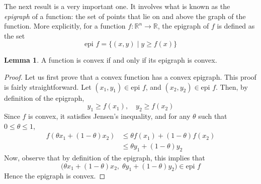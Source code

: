 \documentclass[a4paper]{article}
\theoremstyle{definition}
\newtheorem{lemma}{Lemma}[subsection]
\begin{document}
The next result is a very important one.
It involves what is known as the \textit{epigraph} of a function: the set of points that lie on and above the graph of the function.
More explicitly, for a function $f : \mathbb{R}^n \rightarrow \mathbb{R}$, the epigraph of $f$ is defined as the set
\begin{equation*}
	\text{epi } f = \{ (x, y) \mid y \geq f(x) \}
\end{equation*}

\begin{lemma}
	\label{convex-epigraph}
	A function is convex if and only if its epigraph is convex.
\end{lemma}
\begin{proof}
	Let us first prove that a convex function has a convex epigraph.
	This proof is fairly straightforward.
	Let $(x_1, y_1) \in \text{epi } f$, and $(x_2, y_2) \in \text{epi } f$.
	Then, by definition of the epigraph,
	\begin{equation*}
		y_1 \geq f(x_1), \quad y_2 \geq f(x_2)
	\end{equation*}
	Since $f$ is convex, it satisfies Jensen's inequality, and for any $\theta$ such that $0 \leq \theta \leq 1$,
	\begin{align*}
		f(\theta x_1 + (1 - \theta) x_2) & \leq \theta f(x_1) + (1 - \theta) f(x_2) \\
		& \leq \theta y_1 + (1 - \theta) y_2
	\end{align*}
	Now, observe that by definition of the epigraph, this implies that
	\begin{equation*}
		\big( \theta x_1 + (1 - \theta) x_2, \; \theta y_1 + (1 - \theta) y_2 \big) \in \text{epi } f
	\end{equation*}
	Hence the epigraph is convex.


\end{proof}
\end{document}
